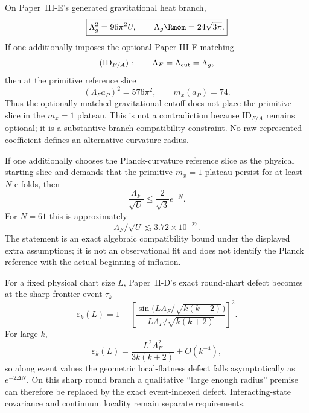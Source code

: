 \documentclass[12pt,a4paper]{article}
\begin{document}
\begin{corollary}[Primitive-curvature gravitational cutoff and frontier matching are incompatible with a Planck \(m_x=1\) slice]
\label{p8:cor:v260-newton-frontier-matching-no-go}
On Paper~III-E's generated gravitational heat branch,
\[
 \boxed{\Lambda_g^2=96\pi^2U,\qquad \Lambda_g\Rmom=24\sqrt{3\pi}.}
\]
If one additionally imposes the optional Paper-III-F matching
\[
 (\mathrm{ID}_{F/A}):\qquad \Lambda_F=\Lambda_{\rm cut}=\Lambda_g,
\]
then at the primitive reference slice
\[
 (\Lambda_Fa_P)^2=576\pi^2,
 \qquad
 \boxed{m_x(a_P)=74}.
\]
Thus the optionally matched gravitational cutoff does not place the primitive slice in the \(m_x=1\) plateau.  This is not a contradiction because \(\mathrm{ID}_{F/A}\) remains optional; it is a substantive branch-compatibility constraint.  No raw represented coefficient defines an alternative curvature radius.
\end{corollary}

\begin{corollary}
\label{p8:cor:v260-primitive-plateau-efold-bound}
If one additionally chooses the Planck-curvature reference slice as the
physical starting slice and demands that the primitive $m_x=1$ plateau persist
for at least $N$ e-folds, then
\[
 \boxed{
 \frac{\Lambda_F}{\sqrt{U}}
 \le\frac2{\sqrt3}e^{-N}.}
\]
For $N=61$ this is approximately
\[
 \boxed{\Lambda_F/\sqrt{U}\lesssim3.72\times10^{-27}.}
\]
The statement is an exact algebraic compatibility bound under the displayed
extra assumptions; it is not an observational fit and does not identify the
Planck reference with the actual beginning of inflation.
\end{corollary}

\begin{proposition}
\label{p8:prop:v260-event-indexed-flatness-rate}
For a fixed physical chart size $L$, Paper~II-D's exact round-chart defect
becomes at the sharp-frontier event $\tau_k$
\[
 \boxed{
 \varepsilon_k(L)
 =1-\left[
 \frac{\sin\!\bigl(L\Lambda_F/\sqrt{k(k+2)}\bigr)}
 {L\Lambda_F/\sqrt{k(k+2)}}
 \right]^2.}
\]
For large $k$,
\[
 \boxed{
 \varepsilon_k(L)
 =\frac{L^2\Lambda_F^2}{3k(k+2)}+O(k^{-4}),}
\]
so along event values the geometric local-flatness defect falls
asymptotically as $e^{-2\Delta N}$.  On this sharp round branch a qualitative
``large enough radius'' premise can therefore be replaced by the exact
event-indexed defect.  Interacting-state covariance and continuum locality
remain separate requirements.
\end{proposition}
\end{document}
